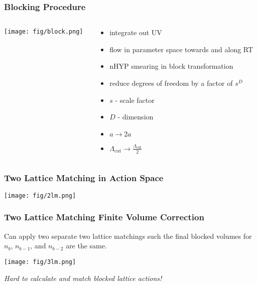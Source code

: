\begin{frame}
  \frametitle{Blocking Procedure}
  \begin{columns}[T]
    \begin{column}{.5\textwidth}
      \begin{block}{}
        \texttt{[image: fig/block.png]}
      \end{block}
    \end{column}
    \begin{column}{.5\textwidth}
      \begin{block}{}
        \begin{itemize}
          \item integrate out UV
          \item flow in parameter space towards and along RT
          \item nHYP smearing in block transformation
          \vspace{12pt}
          \item reduce degrees of freedom by a factor of $s^D$
          \item $s$ - scale factor
          \item $D$ - dimension
          \item $a \rightarrow 2a$
          \item $\Lambda_{\text{cut}} \rightarrow \tfrac{\Lambda_{\text{cut}}}{2}$
        \end{itemize}
      \end{block}
    \end{column}
  \end{columns}
\end{frame}

\begin{frame}
  \frametitle{Two Lattice Matching in Action Space}
  \centering
  \texttt{[image: fig/2lm.png]}
  \newline
\end{frame}

\begin{frame}
  \frametitle{Two Lattice Matching Finite Volume Correction}
  Can apply two separate two lattice matchings such the final blocked volumes for $n_b$, $n_{b-1}$, and $n_{b-2}$ are the same.
  \begin{center}
    \texttt{[image: fig/3lm.png]}
  \end{center}
  \vspace{12pt}
  \emph{Hard to calculate and match blocked lattice actions!}
\end{frame}

